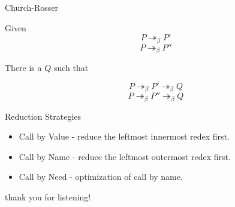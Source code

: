 \documentclass{beamer}
\begin{document}
\begin{frame}{Church-Rosser}
  \begin{theorem}
    Given $$P\twoheadrightarrow_\beta P'$$
          $$P\twoheadrightarrow_\beta P''$$

    There is a $Q$ such that

    $$P\twoheadrightarrow_\beta P'\twoheadrightarrow_\beta Q$$
    $$P\twoheadrightarrow_\beta P''\twoheadrightarrow_\beta Q$$

  \end{theorem}
\end{frame}

\begin{frame}{Reduction Strategies}
  \begin{itemize}
    \item Call by Value - reduce the leftmost innermost redex first.
    \item Call by Name - reduce the leftmost outermost redex first.
    \item Call by Need - optimization of call by name.
  \end{itemize}
\end{frame}

\begin{frame}
  \centering
  thank you for listening!
\end{frame}
\end{document}
